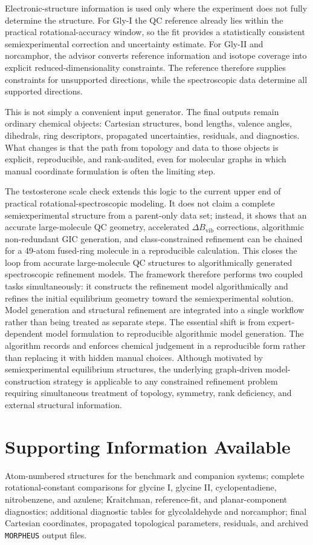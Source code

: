 \documentclass[aip,jcp,reprint,longbibliography,floatfix]{revtex4-2}
\begin{document}
Electronic-structure information is used only where the experiment does not
fully determine the structure. For Gly-I the QC reference already lies within
the practical rotational-accuracy window, so the fit provides a
statistically consistent semiexperimental correction and uncertainty estimate.
For Gly-II and norcamphor, the advisor converts reference information and
isotope coverage into explicit reduced-dimensionality constraints. The
reference therefore supplies constraints for unsupported directions, while the
spectroscopic data determine all supported directions.

This is not simply a convenient input generator. The final outputs remain
ordinary chemical objects: Cartesian structures, bond lengths, valence angles,
dihedrals, ring descriptors, propagated uncertainties, residuals, and
diagnostics. What changes is that the path from topology and data to those
objects is explicit, reproducible, and rank-audited, even for molecular graphs
in which manual coordinate formulation is often the limiting step.

The testosterone scale check extends this logic to the current upper end of
practical rotational-spectroscopic modeling. It does not claim a complete
semiexperimental structure from a parent-only data set; instead, it shows that
an accurate large-molecule QC geometry, accelerated $\Delta B_\mathrm{vib}$
corrections, algorithmic non-redundant GIC generation, and class-constrained
refinement can be chained for a 49-atom fused-ring molecule in a
reproducible calculation. This closes the loop from accurate
large-molecule QC structures to algorithmically generated spectroscopic
refinement models.
The framework therefore performs two coupled tasks simultaneously: it
constructs the refinement model algorithmically and refines the initial
equilibrium geometry toward the semiexperimental solution. Model generation
and structural refinement are integrated into a single workflow rather than
being treated as separate steps.
The essential shift is from expert-dependent model formulation to reproducible
algorithmic model generation. The algorithm records and enforces chemical
judgement in a reproducible form rather than replacing it with hidden manual
choices.
Although motivated by semiexperimental equilibrium structures, the underlying
graph-driven model-construction strategy is applicable to any constrained
refinement problem requiring simultaneous treatment of topology, symmetry, rank
deficiency, and external structural information.

\section*{Supporting Information Available}

Atom-numbered structures for the benchmark and companion systems; complete
rotational-constant comparisons for glycine I, glycine II, cyclopentadiene,
nitrobenzene, and azulene; Kraitchman, reference-fit, and planar-component
diagnostics; additional diagnostic tables for glycolaldehyde and norcamphor;
final Cartesian coordinates, propagated topological parameters, residuals, and
archived \texttt{MORPHEUS} output files.




\end{document}
